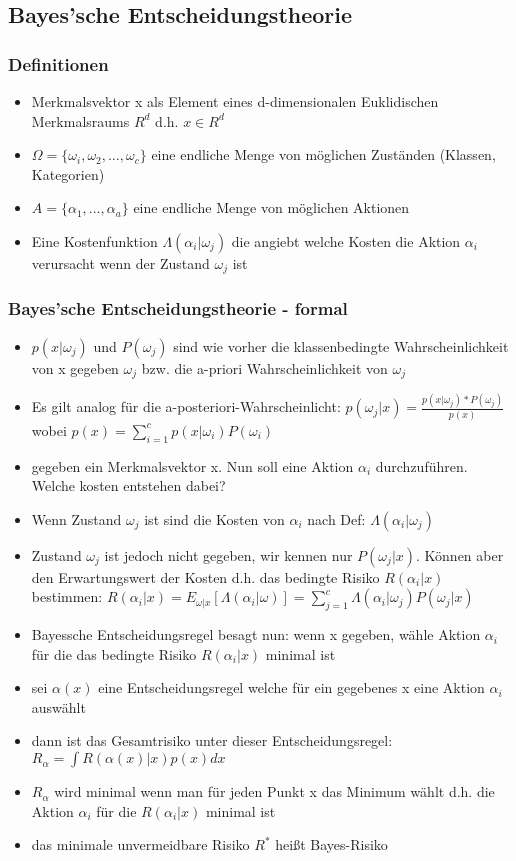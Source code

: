 \documentclass{article} %
\begin{document}
	\subsection{Bayes’sche Entscheidungstheorie}
		\subsubsection{Definitionen}
		\begin{itemize}
			\item Merkmalsvektor x als Element eines d-dimensionalen Euklidischen Merkmalsraums $R^d$ d.h. $x \in R^d$
			\item $\Omega = \{\omega_i,\omega_2,\dots,\omega_c\}$ eine endliche Menge von möglichen Zuständen (Klassen, Kategorien) 
			\item $A = \{\alpha_1,\dots,\alpha_a\}$ eine endliche Menge von möglichen Aktionen
			\item Eine Kostenfunktion $\Lambda(\alpha_i|\omega_j)$ die angiebt welche Kosten die Aktion $\alpha_i$ verursacht wenn der Zustand $\omega_j$ ist
		\end{itemize}
		\subsubsection{Bayes’sche Entscheidungstheorie - formal}
		\begin{itemize}
			\item $p(x|\omega_j)$ und $P(\omega_j)$ sind wie vorher die klassenbedingte Wahrscheinlichkeit von x gegeben $\omega_j$ bzw. die a-priori Wahrscheinlichkeit von $\omega_j$
			\item Es gilt analog für die a-posteriori-Wahrscheinlicht: $p(\omega_j|x) = \frac{p(x|\omega_j)*P(\omega_j)}{p(x)}$ wobei $p(x) = \sum_{i=1}^{c} p(x|\omega_i)P(\omega_i)$
			\item gegeben ein Merkmalsvektor x. Nun soll eine Aktion $\alpha_i$ durchzuführen. Welche kosten entstehen dabei?
			\item Wenn Zustand $\omega_j$ ist sind die Kosten von $\alpha_i$ nach Def: $\Lambda(\alpha_i|\omega_j)$
			\item Zustand $\omega_j$ ist jedoch nicht gegeben, wir kennen nur $P(\omega_j|x)$. Können aber den Erwartungswert der Kosten d.h. das bedingte Risiko $R(\alpha_i|x)$ bestimmen: $R(\alpha_i|x) = E_{\omega|x}[\Lambda(\alpha_i|\omega)] = \sum_{j=1}^{c} \Lambda(\alpha_i|\omega_j)P(\omega_j|x)$
			\item Bayessche Entscheidungsregel besagt nun: wenn x gegeben, wähle Aktion $\alpha_i$ für die das bedingte Risiko $R(\alpha_i|x)$ minimal ist
			\item sei $\alpha(x)$ eine Entscheidungsregel welche für ein gegebenes x eine Aktion $\alpha_i$ auswählt
			\item dann ist das Gesamtrisiko unter dieser Entscheidungsregel: $R_\alpha = \int R(\alpha(x)|x)p(x) dx$
			\item $R_\alpha$ wird minimal wenn man für jeden Punkt x das Minimum wählt d.h. die Aktion $\alpha_i$ für die $R(\alpha_i|x)$ minimal ist
			\item das minimale unvermeidbare Risiko $R^*$ heißt Bayes-Risiko
		\end{itemize}
\end{document}
